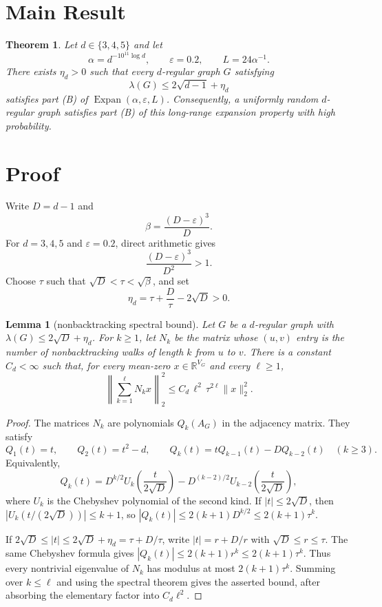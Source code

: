 \documentclass[11pt]{article}
\newtheorem{theorem}{Theorem}
\newtheorem{lemma}{Lemma}
\newcommand{\Expan}{\operatorname{Expan}}
\begin{document}
\section*{Main Result}

\begin{theorem}
Let $d\in\{3,4,5\}$ and let
\[
  \alpha=d^{-10^{11}\log d},\qquad \varepsilon=0.2,\qquad L=24\alpha^{-1}.
\]
There exists $\eta_d>0$ such that every $d$-regular graph $G$ satisfying
\[
  \lambda(G)\le 2\sqrt{d-1}+\eta_d
\]
satisfies part (B) of $\Expan(\alpha,\varepsilon,L)$.  Consequently, a
uniformly random $d$-regular graph satisfies part (B) of this long-range
expansion property with high probability.
\end{theorem}

\section*{Proof}

Write $D=d-1$ and
\[
  \beta=\frac{(D-\varepsilon)^3}{D}.
\]
For $d=3,4,5$ and $\varepsilon=0.2$, direct arithmetic gives
\[
  \frac{(D-\varepsilon)^3}{D^2}>1.
\]
Choose $\tau$ such that $\sqrt D<\tau<\sqrt\beta$, and set
\[
  \eta_d=\tau+\frac{D}{\tau}-2\sqrt D>0.
\]

\begin{lemma}[nonbacktracking spectral bound]
Let $G$ be a $d$-regular graph with $\lambda(G)\le2\sqrt D+\eta_d$.
For $k\ge1$, let $N_k$ be the matrix whose $(u,v)$ entry is the number of
nonbacktracking walks of length $k$ from $u$ to $v$.  There is a constant
$C_d<\infty$ such that, for every mean-zero $x\in\mathbb R^{V_G}$ and every
$\ell\ge1$,
\[
  \left\|\sum_{k=1}^{\ell}N_kx\right\|_2^2
  \le C_d\,\ell^2\,\tau^{2\ell}\|x\|_2^2.
\]
\end{lemma}

\begin{proof}
The matrices $N_k$ are polynomials $Q_k(A_G)$ in the adjacency matrix.  They
satisfy
\[
  Q_1(t)=t,\qquad Q_2(t)=t^2-d,\qquad
  Q_k(t)=tQ_{k-1}(t)-DQ_{k-2}(t)\quad(k\ge3).
\]
Equivalently,
\[
  Q_k(t)=D^{k/2}U_k\!\left(\frac{t}{2\sqrt D}\right)
  -D^{(k-2)/2}U_{k-2}\!\left(\frac{t}{2\sqrt D}\right),
\]
where $U_k$ is the Chebyshev polynomial of the second kind.  If
${|t|}\le2\sqrt D$, then $|U_k(t/(2\sqrt D))|\le k+1$, so
$|Q_k(t)|\le 2(k+1)D^{k/2}\le2(k+1)\tau^k$.

If $2\sqrt D\le |t|\le 2\sqrt D+\eta_d=\tau+D/\tau$, write
${|t|}=r+D/r$ with $\sqrt D\le r\le\tau$.  The same Chebyshev formula gives
$|Q_k(t)|\le2(k+1)r^k\le2(k+1)\tau^k$.  Thus every nontrivial eigenvalue of
$N_k$ has modulus at most $2(k+1)\tau^k$.  Summing over
$k\le\ell$ and using the spectral theorem gives the asserted bound, after
absorbing the elementary factor into $C_d\ell^2$.
\end{proof}
\end{document}
